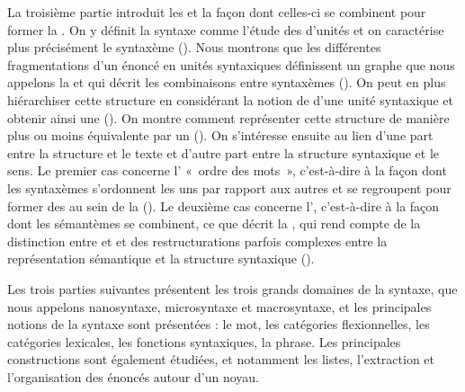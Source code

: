 La troisième partie introduit les  et la façon dont celles-ci se combinent pour former la . On y définit la syntaxe comme l’étude des  d’unités et on caractérise plus précisément le syntaxème (). Nous montrons que les différentes fragmentations d’un énoncé en unités syntaxiques définissent un graphe que nous appelons la  et qui décrit les combinaisons entre syntaxèmes (). On peut en plus hiérarchiser cette structure en considérant la notion de  d’une unité syntaxique et obtenir ainsi une  (). On montre comment représenter cette structure de manière plus ou moins équivalente par un  (). On s’intéresse ensuite au lien d’une part entre la structure et le texte et d’autre part entre la structure syntaxique et le sens. Le premier cas concerne l’ «~ordre des mots~», c’est-à-dire à la façon dont les syntaxèmes s’ordonnent les uns par rapport aux autres et se regroupent pour former des  au sein de la  (). Le deuxième cas concerne l’, c’est-à-dire à la façon dont les sémantèmes se combinent, ce que décrit la , qui rend compte de la distinction entre  et  et des restructurations parfois complexes entre la représentation sémantique et la structure syntaxique ().

Les trois parties suivantes présentent les trois grands domaines de la syntaxe, que nous appelons nanosyntaxe, microsyntaxe et macrosyntaxe, et les principales notions de la syntaxe sont présentées : le mot, les catégories flexionnelles, les catégories lexicales, les fonctions syntaxiques, la phrase. Les principales constructions sont également étudiées, et notamment les listes, l’extraction et l’organisation des énoncés autour d’un noyau.

